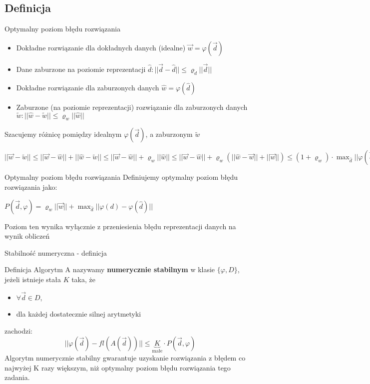 \subsection{Definicja}
\begin{frame}{Optymalny poziom błędu rozwiązania}
    \begin{itemize}
        \item Dokładne rozwiązanie dla dokładnych danych (idealne) 	$ \vec{w} = \varphi(\vec{d}) $
        \item Dane zaburzone na poziomie reprezentacji  $\hat{d}: ||\vec{d} - \hat{d}|| \le \varrho_d ||\vec{d} || $ 
        \item Dokładne rozwiązanie dla zaburzonych danych $\hat{w} = \varphi(\hat{d})$
      \item Zaburzone (na poziomie reprezentacji) rozwiązanie dla zaburzonych danych	$\tilde{w}: ||\hat{w} - \tilde{w} || \le \varrho_w ||\hat{w}||$
    \end{itemize}
   Szacujemy różnicę pomiędzy  idealnym $\varphi(\vec{d})$, a zaburzonym $\tilde{w}$     
  \begin{center}
      $|| \vec{w} - \tilde{w} || \le ||\vec{w} - \hat{w}|| + ||\hat{w} - \tilde{w}|| \le
        	||\vec{w} - \hat{w}|| +\varrho_w ||\hat{w}||
        	\le
        	||\vec{w} - \hat{w}|| +\varrho_w (||\hat{w}-\vec{w}||+||\vec{w}||)
        	\le
        	(1 + \varrho_w) \cdot \max_{\hat{d}} ||\varphi(\vec{d}) - \varphi(\hat{d})|| + \varrho_w ||\vec{w}|| $
  \end{center}     
\end{frame}
\begin{frame}{Optymalny poziom błędu rozwiązania}
Definiujemy optymalny poziom błędu rozwiązania jako:
\begin{center}
    $ P(\vec{d}, \varphi) = \varrho_w ||\vec{w}|| + \max_{\hat{d}} ||\varphi(d) - \varphi(\hat{d})||$
\end{center}

Poziom ten wynika wyłącznie  z przeniesienia błędu  reprezentacji  danych  na  wynik  obliczeń
\end{frame}
\begin{frame}{Stabilność numeryczna - definicja}
	\begin{block}{Definicja}
		Algorytm A nazywamy {\bf numerycznie stabilnym} w klasie $\{\varphi, D\}$, jeżeli istnieje stała $K$ taka, że 
        \begin{itemize}
        	\item $\forall \vec{d} \in D$,
            \item dla każdej dostatecznie silnej arytmetyki
        \end{itemize}
        zachodzi:
        \[
        	||\varphi(\vec{d}) - fl(A(\vec{d}))|| \le \underbrace{K}_\text{małe} \cdot P(\vec{d}, \varphi)
        \]
       Algorytm numerycznie stabilny gwarantuje uzyskanie  rozwiązania  z błędem co najwyżej
K razy większym, niż optymalny poziom błędu rozwiązania tego zadania.
	\end{block}
\end{frame}